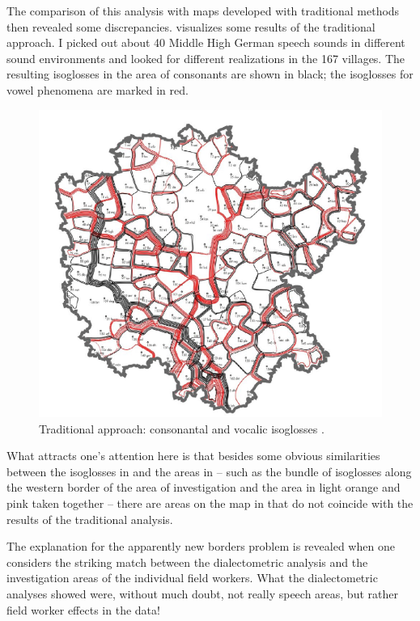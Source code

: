 \documentclass[output=paper]{LSP/langsci}
\begin{document}
The comparison of this analysis with maps developed with traditional methods then revealed some discrepancies.  visualizes some results of the traditional approach. I picked out about 40 Middle High German speech sounds in different sound environments and looked for different realizations in the 167 villages. The resulting isoglosses in the area of consonants are shown in black; the isoglosses for vowel phenomena are marked in red.

\begin{figure}
\includegraphics[width=.7\textwidth]{illustrations/mathus_fig7}
\caption{Traditional approach: consonantal and vocalic isoglosses \citep[107]{mathussek_sprachraume_2014}.}
\label{fig:7}
\end{figure}

What attracts one's attention here is that besides some obvious similarities between the isoglosses in  and the areas in  – such as the bundle of isoglosses along the western border of the area of investigation and the area in light orange and pink taken together – there are areas on the map in  that do not coincide with the results of the traditional analysis.

The explanation for the apparently new borders problem is revealed when one considers the striking match between the dialectometric analysis and the investigation areas of the individual field workers. What the dialectometric analyses showed were, without much doubt, not really speech areas, but rather field worker effects in the data!
\end{document}

